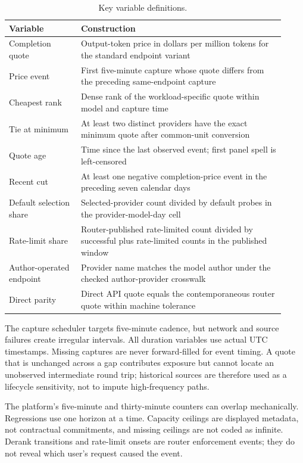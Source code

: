 \documentclass[11pt]{article}
\newcommand{\1}{\mathbf{1}}
\begin{document}
\begin{table}[H]
\centering
\footnotesize
\begin{tabular}{p{0.24\linewidth}p{0.68\linewidth}}
\toprule
Variable & Construction \\
\midrule
Completion quote & Output-token price in dollars per million tokens for the standard endpoint variant \\
Price event & First five-minute capture whose quote differs from the preceding same-endpoint capture \\
Cheapest rank & Dense rank of the workload-specific quote within model and capture time \\
Tie at minimum & At least two distinct providers have the exact minimum quote after common-unit conversion \\
Quote age & Time since the last observed event; first panel spell is left-censored \\
Recent cut & At least one negative completion-price event in the preceding seven calendar days \\
Default selection share & Selected-provider count divided by default probes in the provider-model-day cell \\
Rate-limit share & Router-published rate-limited count divided by successful plus rate-limited counts in the published window \\
Author-operated endpoint & Provider name matches the model author under the checked author-provider crosswalk \\
Direct parity & Direct API quote equals the contemporaneous router quote within machine tolerance \\
\bottomrule
\end{tabular}
\caption{Key variable definitions.}
\label{tab:variables}
\end{table}

The capture scheduler targets five-minute cadence, but network and source failures
create irregular intervals.  All duration variables use actual UTC timestamps.
Missing captures are never forward-filled for event timing.  A quote that is
unchanged across a gap contributes exposure but cannot locate an unobserved
intermediate round trip; historical sources are therefore used as a lifecycle
sensitivity, not to impute high-frequency paths.

The platform's five-minute and thirty-minute counters can overlap mechanically.
Regressions use one horizon at a time.  Capacity ceilings are displayed metadata,
not contractual commitments, and missing ceilings are not coded as infinite.
Derank transitions and rate-limit onsets are router enforcement events; they do not
reveal which user's request caused the event.
\end{document}
